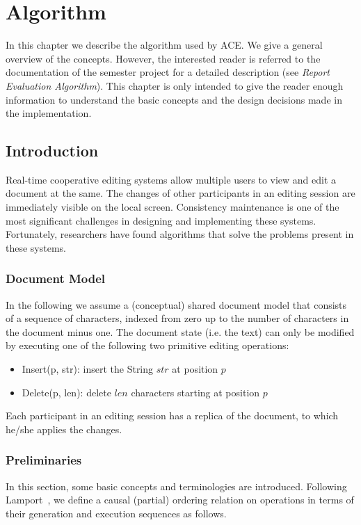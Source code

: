 \chapter{Algorithm}
\label{chapter:algorithm}

In this chapter we describe the algorithm used by ACE. We give a general
overview of the concepts. However, the interested reader is referred to
the documentation of the semester project for a detailed description (see 
\emph{Report Evaluation Algorithm}). This chapter is only intended to give
the reader enough information to understand the basic concepts and the
design decisions made in the implementation.



\section{Introduction}
Real-time cooperative editing systems allow multiple users to view and edit a
document at the same. The changes of other participants in an editing
session are immediately visible on the local screen. Consistency maintenance
is one of the most significant challenges in designing and implementing
these systems. Fortunately, researchers have found algorithms that solve the
problems present in these systems.


\subsection{Document Model}
In the following we assume a (conceptual) shared document model that consists 
of a sequence of characters, indexed from zero up to the number of characters in
the document minus one. The document state (i.e. the text) can only be 
modified by executing one of the following two primitive editing operations:

\begin{itemize}
 \item Insert(p, str): insert the String $str$ at position $p$
 \item Delete(p, len): delete $len$ characters starting at position $p$
\end{itemize}

Each participant in an editing session has a replica of the document, to which
he/she applies the changes.


\subsection{Preliminaries}
In this section, some basic concepts and terminologies are introduced. Following Lamport~\cite{lamport78}, we define a causal (partial) ordering relation on operations in terms of their generation and execution sequences as follows.

